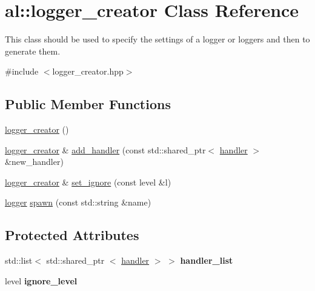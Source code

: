 \hypertarget{classal_1_1logger__creator}{\section{al\-:\-:logger\-\_\-creator \-Class \-Reference}
\label{classal_1_1logger__creator}
}


\-This class should be used to specify the settings of a logger or loggers and then to generate them.  




{\ttfamily \#include $<$logger\-\_\-creator.\-hpp$>$}

\subsection*{\-Public \-Member \-Functions}
\begin{DoxyCompactItemize}
\item 
\hyperlink{classal_1_1logger__creator_aa09b2da8d857d2dd0757090a6e94b27e}{logger\-\_\-creator} ()
\item 
\hyperlink{classal_1_1logger__creator}{logger\-\_\-creator} \& \hyperlink{classal_1_1logger__creator_a4d321e8c955dcef2f66c349146011af9}{add\-\_\-handler} (const std\-::shared\-\_\-ptr$<$ \hyperlink{classal_1_1handler}{handler} $>$ \&new\-\_\-handler)
\item 
\hyperlink{classal_1_1logger__creator}{logger\-\_\-creator} \& \hyperlink{classal_1_1logger__creator_a59bb08d9ed8c2ffd5c33f40782d8465e}{set\-\_\-ignore} (const level \&l)
\item 
\hyperlink{classal_1_1logger}{logger} \hyperlink{classal_1_1logger__creator_a0053f184b8c9b376d704201f7e3bb247}{spawn} (const std\-::string \&name)
\end{DoxyCompactItemize}
\subsection*{\-Protected \-Attributes}
\begin{DoxyCompactItemize}
\item 
\hypertarget{classal_1_1logger__creator_a323fe35f3321938c644f5fa67f658d89}{std\-::list$<$ std\-::shared\-\_\-ptr\*
$<$ \hyperlink{classal_1_1handler}{handler} $>$ $>$ {\bfseries handler\-\_\-list}}\label{classal_1_1logger__creator_a323fe35f3321938c644f5fa67f658d89}

\item 
\hypertarget{classal_1_1logger__creator_ad0994503771844b237fd9593ed964dc3}{level {\bfseries ignore\-\_\-level}}\label{classal_1_1logger__creator_ad0994503771844b237fd9593ed964dc3}

\end{DoxyCompactItemize}


